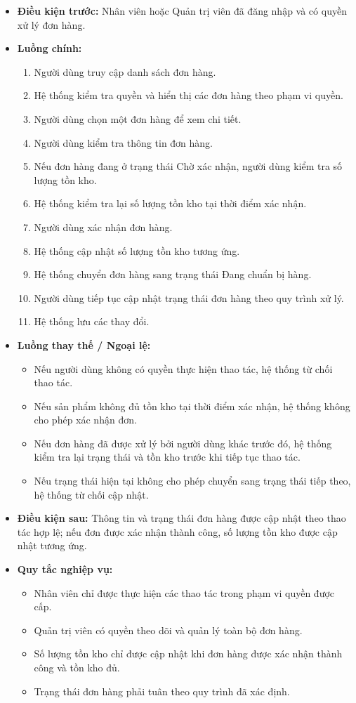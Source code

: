 \documentclass[12pt,a4paper]{article}
\begin{document}
\begin{itemize}
    \item \textbf{Điều kiện trước:} Nhân viên hoặc Quản trị viên đã đăng nhập và có quyền xử lý đơn hàng.
    \item \textbf{Luồng chính:}
    \begin{enumerate}
        \item Người dùng truy cập danh sách đơn hàng.
        \item Hệ thống kiểm tra quyền và hiển thị các đơn hàng theo phạm vi quyền.
        \item Người dùng chọn một đơn hàng để xem chi tiết.
        \item Người dùng kiểm tra thông tin đơn hàng.
        \item Nếu đơn hàng đang ở trạng thái Chờ xác nhận, người dùng kiểm tra số lượng tồn kho.
        \item Hệ thống kiểm tra lại số lượng tồn kho tại thời điểm xác nhận.
        \item Người dùng xác nhận đơn hàng.
        \item Hệ thống cập nhật số lượng tồn kho tương ứng.
        \item Hệ thống chuyển đơn hàng sang trạng thái Đang chuẩn bị hàng.
        \item Người dùng tiếp tục cập nhật trạng thái đơn hàng theo quy trình xử lý.
        \item Hệ thống lưu các thay đổi.
    \end{enumerate}
    \item \textbf{Luồng thay thế / Ngoại lệ:}
    \begin{itemize}
        \item Nếu người dùng không có quyền thực hiện thao tác, hệ thống từ chối thao tác.
        \item Nếu sản phẩm không đủ tồn kho tại thời điểm xác nhận, hệ thống không cho phép xác nhận đơn.
        \item Nếu đơn hàng đã được xử lý bởi người dùng khác trước đó, hệ thống kiểm tra lại trạng thái và tồn kho trước khi tiếp tục thao tác.
        \item Nếu trạng thái hiện tại không cho phép chuyển sang trạng thái tiếp theo, hệ thống từ chối cập nhật.
    \end{itemize}
    \item \textbf{Điều kiện sau:} Thông tin và trạng thái đơn hàng được cập nhật theo thao tác hợp lệ; nếu đơn được xác nhận thành công, số lượng tồn kho được cập nhật tương ứng.
    \item \textbf{Quy tắc nghiệp vụ:}
    \begin{itemize}
        \item Nhân viên chỉ được thực hiện các thao tác trong phạm vi quyền được cấp.
        \item Quản trị viên có quyền theo dõi và quản lý toàn bộ đơn hàng.
        \item Số lượng tồn kho chỉ được cập nhật khi đơn hàng được xác nhận thành công và tồn kho đủ.
        \item Trạng thái đơn hàng phải tuân theo quy trình đã xác định.
    \end{itemize}
\end{itemize}
\end{document}
